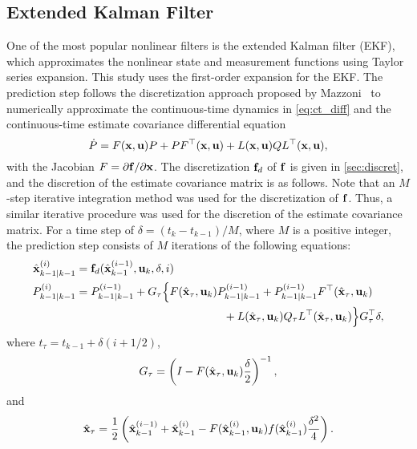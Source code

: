 \documentclass[../zhang_thesis.tex]{subfiles}
\begin{document}
\subsection{Extended Kalman Filter}
\label{sec:ekf}

One of the most popular nonlinear filters is the extended Kalman filter (EKF), which approximates the nonlinear state and measurement functions using Taylor series expansion. This study uses the first-order expansion for the EKF. The prediction step follows the discretization approach proposed by Mazzoni~\cite{mazzoni07} to numerically approximate the continuous-time dynamics in \cref{eq:ct_diff} and the continuous-time estimate covariance differential equation
\begin{equation}
    \dot{P} = F(\mathbf{x},\mathbf{u}) P + P F^\top(\mathbf{x},\mathbf{u}) + L(\mathbf{x},\mathbf{u}) Q L^\top(\mathbf{x},\mathbf{u}),
\end{equation}
with the Jacobian $F=\partial\mathbf{f}/\partial\mathbf{x}$. The discretization $\mathbf{f}_d$ of $\mathbf{f}$ is given in \cref{sec:discret}, and the discretion of the estimate covariance matrix is as follows. Note that an $M$-step iterative integration method was used for the discretization of $\mathbf{f}$. Thus, a similar iterative procedure was used for the discretion of the estimate covariance matrix. For a time step of $\delta=(t_k-t_{k-1})/M$, where $M$ is a positive integer, the prediction step consists of $M$
iterations of the following equations:
\begin{align}
    \hat{\vx}_{k-1|k-1}^{(i)} &= \vf_d(\hat{\vx}_{k-1}^{(i-1)},\vu_k,\delta,i) \label{eq:ekfpredx} \\
    P_{k-1|k-1}^{(i)} &= \begin{multlined}[t] P_{k-1|k-1}^{(i-1)} + G_\tau \Big\{ F(\hat{\vx}_\tau,\vu_k) P_{k-1|k-1}^{(i-1)} + P_{k-1|k-1}^{(i-1)} F^\top(\hat{\vx}_\tau,\vu_k) \\ + L(\hat{\vx}_\tau,\vu_k) Q_\tau L^\top(\hat{\vx}_\tau,\vu_k) \Big\} G_\tau^\top \delta, \end{multlined} \label{eq:ekfpredz}
\end{align}
where $t_\tau = t_{k-1}+\delta(i+1/2)$, 
\begin{equation}
    G_\tau = \left( I - F(\hat{\mathbf{x}}_\tau,\mathbf{u}_k) \frac{\delta}{2} \right)^{-1},
\end{equation}
and
\begin{equation}
    \hat{\mathbf{x}}_\tau = \frac{1}{2} \left( \hat{\mathbf{x}}_{k-1}^{(i-1)} + \hat{\mathbf{x}}_{k-1}^{(i)} - F(\hat{\mathbf{x}}_{k-1}^{(i)},\mathbf{u}_k) f(\hat{\mathbf{x}}_{k-1}^{(i)}) \frac{\delta^2}{4} \right).
\end{equation}
\end{document}
